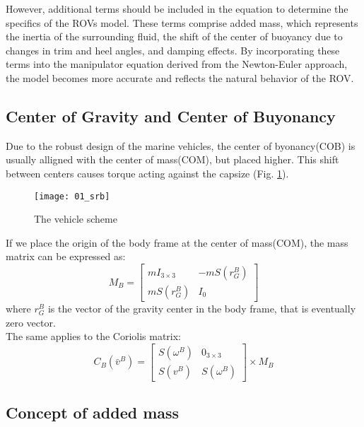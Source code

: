     However, additional terms should be included in the equation to determine the specifics of the ROVs model. 
    These terms comprise added mass, which represents the inertia of the surrounding fluid, the shift of the 
    center of buoyancy due to changes in trim and heel angles, and damping effects. 
    By incorporating these terms into the manipulator equation derived from the Newton-Euler approach, 
    the model becomes more accurate and reflects the natural behavior of the ROV.    

\subsection{Center of Gravity and Center of Buyonancy}
    
    Due to the robust design of the marine vehicles, the center of byonancy(COB) is usually alligned with
    the center of mass(COM), but placed higher.
    This shift between centers causes torque acting against the capsize (Fig. \ref{image:scheme}).\\
    \begin{figure}[H]
        \centering\texttt{[image: 01\_srb]}
        \caption{The vehicle scheme}
        \label{image:scheme}
    \end{figure}
    
    If we place the origin of the body frame at the center of mass(COM), the mass matrix can be expressed as:\\
    $$
    M_B=\left[\begin{array}{cc}
        m I_{3 \times 3} & -m S\left(r_G^B\right) \\
        m S\left(r_G^B\right) & I_0
    \end{array}\right]
    $$
    where $r_G^B$ is the vector of the gravity center in the body frame, that is eventually zero vector.\\
    The same applies to the Coriolis matrix:
    $$
    C_B(\bar{v}^B) =\left[\begin{array}{cc}
        S(\omega^B) & 0_{3 \times 3} \\
        S(v^B) & S(\omega^B)
    \end{array}\right]\times M_B
    $$
\subsection{Concept of added mass}

